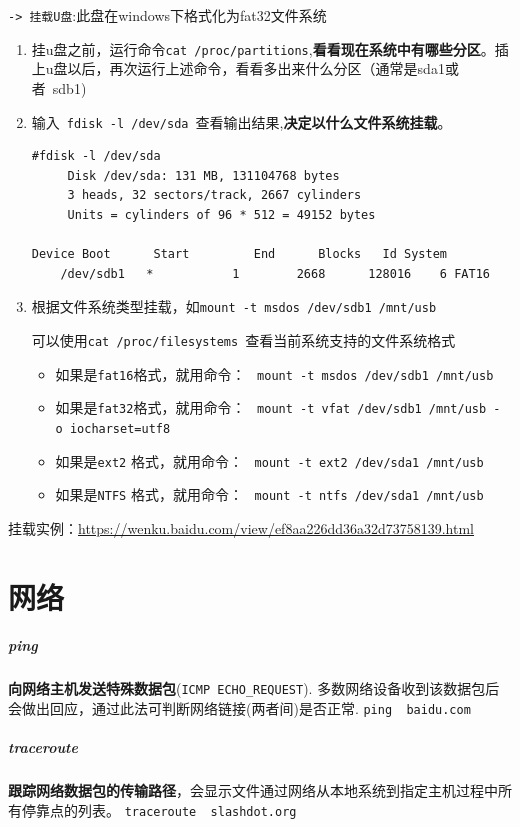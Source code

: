 \documentclass[UTF8,a4paper,12pt]{ctexbook}
\begin{document}
			\verb|-> 挂载U盘|:此盘在windows下格式化为fat32文件系统
				\begin{enumerate}
					\item 挂u盘之前，运行命令\verb|cat /proc/partitions|,\textbf{看看现在系统中有哪些分区}。插上u盘以后，再次运行上述命令，看看多出来什么分区（通常是sda1或者 sdb1)
					
					\item 输入 \verb|fdisk -l /dev/sda| 查看输出结果,\textbf{决定以什么文件系统挂载}。
					\begin{lstlisting}[frame=L,xleftmargin=.1\textwidth]
	#fdisk -l /dev/sda 
	 Disk /dev/sda: 131 MB, 131104768 bytes      
	 3 heads, 32 sectors/track, 2667 cylinders      
	 Units = cylinders of 96 * 512 = 49152 bytes 
	 Device Boot      Start         End      Blocks   Id System     
	/dev/sdb1   *           1        2668      128016    6 FAT16
					\end{lstlisting}
					
					\item 根据文件系统类型挂载，如\verb|mount -t msdos /dev/sdb1 /mnt/usb|
					
					可以使用\verb|cat /proc/filesystems |查看当前系统支持的文件系统格式
						\begin{itemize}
							\item 如果是\verb|fat16|格式，就用命令：  \verb|mount -t msdos /dev/sdb1 /mnt/usb| 
							\item 如果是\verb|fat32|格式，就用命令： 	\verb|mount -t vfat /dev/sdb1 /mnt/usb -o iocharset=utf8 |
							\item 如果是\verb|ext2| 格式，就用命令：  \verb|mount -t ext2 /dev/sda1 /mnt/usb|
							\item 如果是\verb|NTFS| 格式，就用命令：  \verb|mount -t ntfs /dev/sda1 /mnt/usb|
						\end{itemize}
				\end{enumerate}
				
				挂载实例：\url{https://wenku.baidu.com/view/ef8aa226dd36a32d73758139.html}
	\section{网络}	
			\subparagraph{ping} \textbf{向网络主机发送特殊数据包}(\verb|ICMP ECHO_REQUEST|). 多数网络设备收到该数据包后会做出回应，通过此法可判断网络链接(两者间)是否正常. \verb|ping  baidu.com|
			
			\subparagraph{traceroute} \textbf{跟踪网络数据包的传输路径}，会显示文件通过网络从本地系统到指定主机过程中所有停靠点的列表。 \verb|traceroute  slashdot.org|
			
\end{document}
